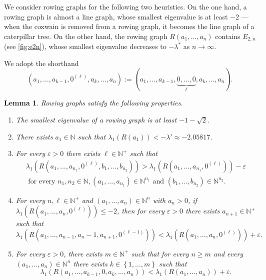 \documentclass[11pt]{article}
\newtheorem{lemma}[theorem]{Lemma}
\theoremstyle{definition}
\theoremstyle{remark}
\newcommand{\sset}[1]{\left\{{#1}\right\}}
\newcommand{\eps}{\varepsilon}
\newcommand{\la}{\lambda}
\newcommand{\N}{\mathbb{N}}
\begin{document}
We consider rowing graphs for the following two heuristics. On the one hand, a rowing graph is almost a line graph, whose smallest eigenvalue is at least $-2$ --- when the coxwain is removed from a rowing graph, it becomes the line graph of a caterpillar tree. On the other hand, the rowing graph $R(a_1, \dots, a_n)$ contains $E_{2,n}$ (see \cref{fig:e2n}), whose smallest eigenvalue decreases to $-\la^*$ as $n \to \infty$.

We adopt the shorthand
\[
    (a_1, \dots, a_{k-1}, 0^{(\ell)}, a_k, \dots, a_n) := (a_1, \dots, a_{k-1}, \underbrace{0, \dots, 0}_{\ell}, a_k, \dots, a_n).
\]

\begin{lemma} \label{lem:rowing}
    Rowing graphs satisfy the following properties.
    \begin{enumerate}[label=(\alph*)]
        \item \label{lem:rowing-0} The smallest eigenvalue of a rowing graph is at least $-1-\sqrt{2}$.
        \item \label{lem:rowing-a} There exists $a_1 \in \N$ such that $\la_1(R(a_1)) < -\la' \approx -2.05817$.
        \item \label{lem:rowing-b} For every $\eps > 0$ there exists $\ell \in \N^+$ such that
            \begin{multline*}
                \la_1(R(a_1, \dots, a_{n_1}, 0^{(\ell)}, b_{1}, \dots, b_{n_2})) > \la_1(R(a_1, \dots, a_{n_1}, 0^{(\ell)})) - \eps\\
                \text{ for every }n_1, n_2 \in \N, (a_1, \dots, a_{n_1}) \in \N^{n_1} \text{ and } (b_1, \dots, b_{n_2}) \in \N^{n_2}.  
            \end{multline*}
        \item \label{lem:rowing-c} For every $n, \ell \in \N^+$ and $(a_1, \dots, a_n) \in \N^n$ with $a_n > 0$, if $\la_1(R(a_1, \dots, a_n, 0^{(\ell)})) \le -2$, then for every $\eps > 0$ there exists $a_{n+1} \in \N^+$ such that
            \[
                \la_1(R(a_1, \dots, a_{n-1}, a_n-1, a_{n+1}, 0^{(\ell - 1)})) < \la_1(R(a_1, \dots, a_n, 0^{(\ell)})) + \eps.
            \]
        \item \label{lem:rowing-d} For every $\eps > 0$, there exists $m \in \N^+$ such that for every $n \ge m$ and every $(a_1, \dots, a_n) \in \N^n$ there exists $k \in \sset{1, \dots, m}$ such that
            \[
                \la_1(R(a_1, \dots, a_{k-1}, 0, a_k, \dots, a_n)) < \la_1(R(a_1, \dots, a_n)) + \eps.
            \]
    \end{enumerate}
\end{lemma}
\end{document}
